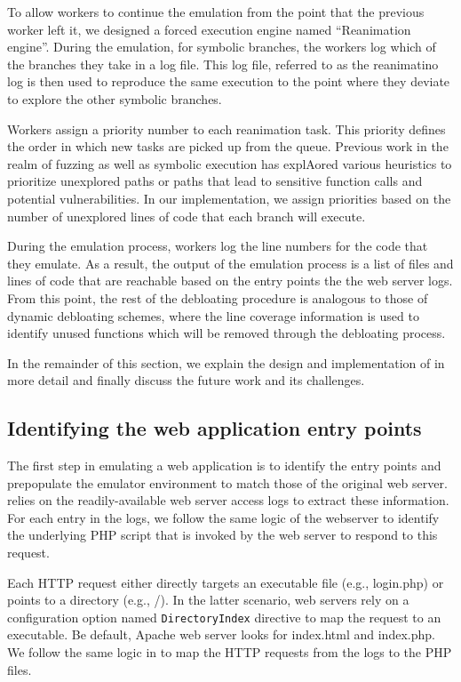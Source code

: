 To allow workers to continue the emulation from the point that the previous worker left it, we designed a forced execution engine named ``Reanimation engine''. 
During the emulation, for symbolic branches, the workers log which of the branches they take in a log file. 
This log file, referred to as the reanimatino log is then used to reproduce the same execution to the point where they deviate to explore the other symbolic branches. 

Workers assign a priority number to each reanimation task. 
This priority defines the order in which new tasks are picked up from the queue. 
Previous work in the realm of fuzzing as well as symbolic execution has explAored various heuristics to prioritize unexplored paths or paths that lead to sensitive function calls and potential vulnerabilities. 
In our implementation, we assign priorities based on the number of unexplored lines of code that each branch will execute. 

During the emulation process, workers log the line numbers for the code that they emulate. 
As a result, the output of the emulation process is a list of files and lines of code that are reachable based on the entry points the the web server logs. 
From this point, the rest of the debloating procedure is analogous to those of dynamic debloating schemes, where the line coverage information is used to identify unused functions which will be removed through the debloating process. 

In the remainder of this section, we explain the design and implementation of \sys{} in more detail and finally discuss the future work and its challenges. 

\subsection{Identifying the web application entry points}
The first step in emulating a web application is to identify the entry points and prepopulate the emulator environment to match those of the original web server. 
\sys{} relies on the readily-available web server access logs to extract these information. 
For each entry in the logs, we follow the same logic of the webserver to identify the underlying PHP script that is invoked by the web server to respond to this request. 

Each HTTP request either directly targets an executable file (e.g., login.php) or points to a directory (e.g., /). 
In the latter scenario, web servers rely on a configuration option named \texttt{DirectoryIndex} directive to map the request to an executable. 
Be default, Apache web server looks for index.html and index.php. 
We follow the same logic in \sys{} to map the HTTP requests from the logs to the PHP files. 


